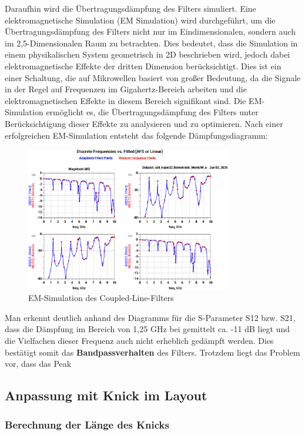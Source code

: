 Daraufhin wird die Übertragungsdämpfung des Filters simuliert. Eine elektromagnetische Simulation (EM Simulation) wird durchgeführt, um die Übertragungsdämpfung des Filters nicht nur im Eindimensionalen, sondern auch im 2,5-Dimensionalen Raum zu betrachten. 
Dies bedeutet, dass die Simulation in einem physikalischen System geometrisch in 2D beschrieben wird, jedoch dabei elektromagnetische Effekte der dritten Dimension berücksichtigt. 
Dies ist ein einer Schaltung, die auf Mikrowellen basiert von großer Bedeutung, da die Signale in der Regel auf Frequenzen im Gigahertz-Bereich arbeiten und die elektromagnetischen Effekte in diesem Bereich signifikant sind. 
Die EM-Simulation ermöglicht es, die Übertragungsdämpfung des Filters unter Berücksichtigung dieser Effekte zu analysieren und zu optimieren.
Nach einer erfolgreichen EM-Simulation entsteht das folgende Dämpfungsdiagramm:
\begin{figure}[H]
    \centering
    \includegraphics[width=0.8\textwidth]{Pictures/EMSimulationohneKnick.png}
    \caption{EM-Simulation des Coupled-Line-Filters}
\end{figure}

Man erkennt deutlich anhand des Diagramms für die S-Parameter S12 bzw. S21, dass die Dämpfung im Bereich von 1,25 GHz bei gemittelt ca. -11 dB liegt und die Vielfachen dieser Frequenz auch nicht erheblich gedämpft werden. Dies bestätigt somit das \textbf{Bandpassverhalten} des Filters.
Trotzdem liegt das Problem vor, dass das Peak 
\subsection{Anpassung mit Knick im Layout}
\subsubsection{Berechnung der Länge des Knicks}

